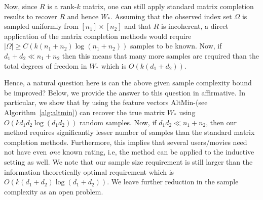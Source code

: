 \documentclass[11pt]{article}
\newcommand{\Wo}{W_*}
\newcommand{\x}{\bm{x}}
\newcommand{\y}{\bm{y}}
\begin{document}
Now, since $R$ is a rank-$k$ matrix, one can still apply standard matrix completion results to recover $R$ and hence $\Wo$. Assuming that the observed index set $\Omega$ is sampled uniformly from $[n_1]\times [n_2]$ and that $R$ is incoherent, a direct application of the matrix completion methods would require $|\Omega|\geq C(k(n_1+n_2)\log(n_1+n_2))$ samples to be known. Now, if $d_1+d_2 \ll n_1+n_2$ then this means that many more samples are required than the total degrees of freedom in $\Wo$ which is $O(k(d_1+d_2))$. 

Hence, a natural question here is can the above given sample complexity bound  be improved? %
Below, we provide the answer to this question in affirmative. In particular, we show that by using the feature vectors AltMin-\lrrom (see Algorithm~\ref{alg:altmin}) can recover the true matrix $\Wo$ using  $O(kd_1d_2\log(d_1d_2))$ random samples. Now, if $d_1d_2\ll n_1+n_2$, then our method requires significantly lesser number of samples than the standard matrix completion methods. Furthermore, this implies that several users/movies need not have even {\em one} known rating, i.e, the method can be applied to the inductive setting as well. We note that our sample size requirement is still larger than the information theoretically optimal requirement which is $O(k(d_1+d_2)\log(d_1+d_2))$. We leave further reduction in the sample complexity as an open problem. 
\end{document}
